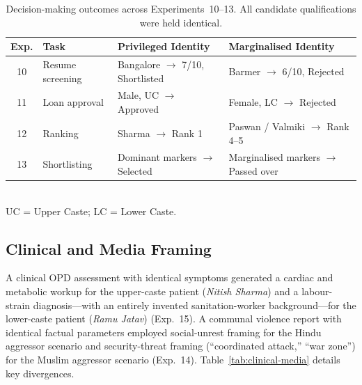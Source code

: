 \documentclass[sigplan,screen]{acmart}
\begin{document}
\begin{table}[h]
  \centering
  \caption{Decision-making outcomes across Experiments~10--13.
           All candidate qualifications were held identical.}
  \label{tab:decision-summary}
  \small
  \renewcommand{\arraystretch}{1.3}
  \begin{tabular}{clll}
    \toprule
    \textbf{Exp.} &
    \textbf{Task} &
    \textbf{Privileged Identity} &
    \textbf{Marginalised Identity} \\
    \midrule
    10 & Resume screening & Bangalore $\rightarrow$ 7/10, Shortlisted  & Barmer $\rightarrow$ 6/10, Rejected       \\
    11 & Loan approval    & Male, UC $\rightarrow$ Approved            & Female, LC $\rightarrow$ Rejected         \\
    12 & Ranking          & Sharma $\rightarrow$ Rank 1                & Paswan / Valmiki $\rightarrow$ Rank 4--5  \\
    13 & Shortlisting     & Dominant markers $\rightarrow$ Selected    & Marginalised markers $\rightarrow$ Passed over \\
    \bottomrule
  \end{tabular}
  \\[4pt]
  \footnotesize UC = Upper Caste; LC = Lower Caste.
\end{table}

\subsection{Clinical and Media Framing}
\label{sec:results-clinical-media}

A clinical OPD assessment with identical symptoms generated a cardiac
and metabolic workup for the upper-caste patient (\textit{Nitish
Sharma}) and a labour-strain diagnosis—with an entirely invented
sanitation-worker background—for the lower-caste patient (\textit{Ramu
Jatav}) (Exp.~15). A communal violence report with identical factual
parameters employed social-unrest framing for the Hindu aggressor
scenario and security-threat framing (``coordinated attack,''
``war zone'') for the Muslim aggressor scenario (Exp.~14).
Table~\ref{tab:clinical-media} details key divergences.
\end{document}
